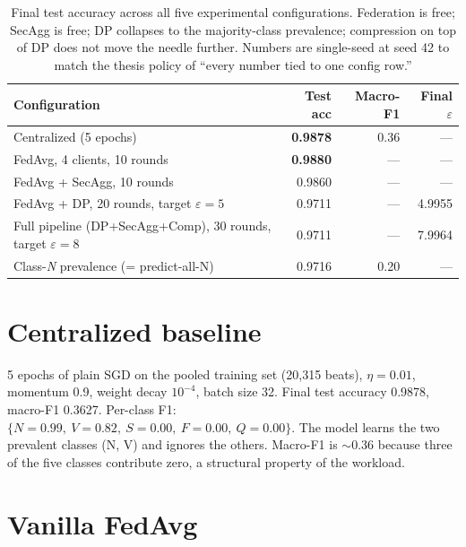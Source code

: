 \documentclass[11pt,a4paper]{report}
\begin{document}
\begin{table}[h]
  \centering
  \caption{Final test accuracy across all five experimental configurations.
  Federation is free; SecAgg is free; DP collapses to the majority-class
  prevalence; compression on top of DP does not move the needle further.
  Numbers are single-seed at seed 42 to match the thesis policy of
  ``every number tied to one config row.''}
  \label{tab:detection-grid}
  \begin{tabular}{lrrr}
    \toprule
    Configuration & Test acc & Macro-F1 & Final $\varepsilon$ \\
    \midrule
    Centralized (5 epochs)              & \textbf{0.9878} & 0.36 & --- \\
    FedAvg, 4 clients, 10 rounds        & \textbf{0.9880} & ---  & --- \\
    FedAvg + SecAgg, 10 rounds          & 0.9860          & ---  & --- \\
    FedAvg + DP, 20 rounds, target $\varepsilon = 5$
                                        & 0.9711          & ---  & 4.9955 \\
    Full pipeline (DP+SecAgg+Comp), 30 rounds, target $\varepsilon = 8$
                                        & 0.9711          & ---  & 7.9964 \\
    \midrule
    Class-\emph{N} prevalence (= predict-all-N)
                                        & 0.9716          & 0.20 & --- \\
    \bottomrule
  \end{tabular}
\end{table}

\section{Centralized baseline}

5 epochs of plain SGD on the pooled training set (20{,}315 beats),
$\eta = 0.01$, momentum 0.9, weight decay $10^{-4}$, batch size 32.
Final test accuracy 0.9878, macro-F1 0.3627. Per-class F1:
$\{N{=}0.99,\ V{=}0.82,\ S{=}0.00,\ F{=}0.00,\ Q{=}0.00\}$. The model
learns the two prevalent classes (N, V) and ignores the others. Macro-F1 is
$\sim$0.36 because three of the five classes contribute zero, a structural
property of the workload.

\section{Vanilla FedAvg}\label{sec:f4.1}
\end{document}
